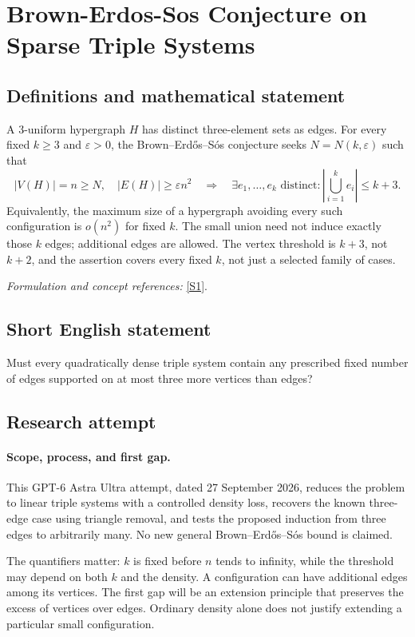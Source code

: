\documentclass[11pt]{article}
\begin{document}
\section*{\texorpdfstring{Brown-Erdos-Sos Conjecture on Sparse Triple Systems}{Brown-Erdos-Sos Conjecture on Sparse Triple Systems}}\label{417}
\subsection{Definitions and mathematical statement}
A $3$-uniform hypergraph $H$ has distinct three-element sets as edges. For every fixed $k\ge3$ and ${\varepsilon}>0$, the Brown--Erd\H{o}s--S\'os conjecture seeks $N=N(k,{\varepsilon})$ such that
\[
 |V(H)|=n\ge N,\quad |E(H)|\ge{\varepsilon} n^2
 \quad\Longrightarrow\quad
 \exists e_1,\ldots,e_k\text{ distinct}:\left|\bigcup_{i=1}^k e_i\right|\le k+3.
\]
Equivalently, the maximum size of a hypergraph avoiding every such configuration is $o(n^2)$ for fixed $k$. The small union need not induce exactly those $k$ edges; additional edges are allowed. The vertex threshold is $k+3$, not $k+2$, and the assertion covers every fixed $k$, not just a selected family of cases.
\par\smallskip\textit{Formulation and concept references:} \href{https://www.math.tau.ac.il/~asafico/bes.pdf}{[S1]}.

\subsection{Short English statement}
Must every quadratically dense triple system contain any prescribed fixed number of edges supported on at most three more vertices than edges?
\subsection{Research attempt}
\paragraph{Scope, process, and first gap.}
This GPT-6 Astra Ultra attempt, dated 27 September 2026, reduces the problem to linear triple systems with a controlled density loss, recovers the known three-edge case using triangle removal, and tests the proposed induction from three edges to arbitrarily many. No new general Brown--Erd\H{o}s--S\'os bound is claimed.

The quantifiers matter: $k$ is fixed before $n$ tends to infinity, while the threshold may depend on both $k$ and the density. A configuration can have additional edges among its vertices. The first gap will be an extension principle that preserves the excess of vertices over edges. Ordinary density alone does not justify extending a particular small configuration.
\end{document}
